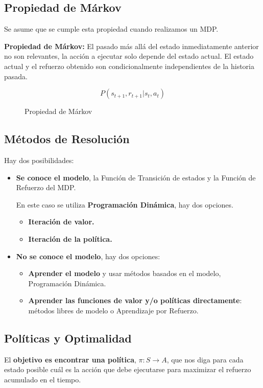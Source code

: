\documentclass[12pt, twoside, openright]{report} %
\begin{document}
\subsection{Propiedad de Márkov}
Se asume que se cumple esta propiedad cuando realizamos un MDP.

\textbf{Propiedad de Márkov:} El pasado más allá del estado inmediatamente anterior no son relevantes, la acción a ejecutar solo depende del estado actual. El estado actual y el refuerzo obtenido son condicionalmente independientes de la historia pasada.
\begin{figure}[H]
	$$P(s_{t+1}, r_{t+1}| s_t,a_t)$$
	\captionsetup{justification=centering}
	\caption{Propiedad de Márkov}
\end{figure}

\subsection{Métodos de Resolución}
Hay dos posibilidades:
\begin{itemize}
	\item \textbf{Se conoce el modelo}, la Función de Transición de estados y la Función de Refuerzo del MDP.

	      En este caso se utiliza \textbf{Programación Dinámica}, hay dos opciones.
	      \begin{itemize}
		      \item \textbf{Iteración de valor.}
		      \item \textbf{Iteración de la política.}
	      \end{itemize}
	\item \textbf{No se conoce el modelo}, hay dos opciones:
	      \begin{itemize}
		      \item \textbf{Aprender el modelo} y usar métodos basados en el modelo, Programación Dinámica.
		      \item \textbf{Aprender las funciones de valor y/o políticas directamente}: métodos libres de modelo o Aprendizaje por Refuerzo.
	      \end{itemize}
\end{itemize}

\subsection{Políticas y Optimalidad}

El \textbf{objetivo es encontrar una política}, $\pi: S \rightarrow A$, que nos diga para cada estado posible cuál es la acción que debe ejecutarse para maximizar el refuerzo acumulado en el tiempo.
\end{document}
